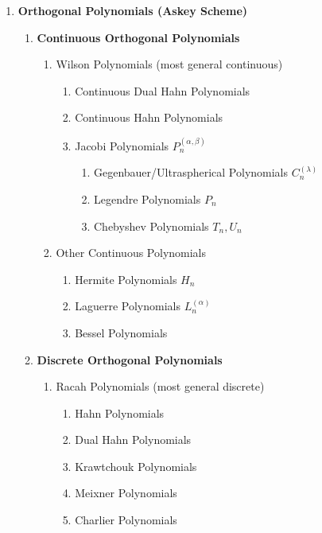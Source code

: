 \begin{enumerate}[label=\textbf{\arabic*.}]
	\item \textbf{Orthogonal Polynomials (Askey Scheme)}
	\begin{enumerate}[label=\textbf{\alph*)}]
		\item \textbf{Continuous Orthogonal Polynomials}
		\begin{enumerate}[label=\textbf{\roman*)}]
			\item Wilson Polynomials (most general continuous)
			\begin{enumerate}[label=\textbf{\arabic*)}]
				\item Continuous Dual Hahn Polynomials
				\item Continuous Hahn Polynomials
				\item Jacobi Polynomials $P_n^{(\alpha,\beta)}$
				\begin{enumerate}[label=\textbf{\Alph*)}]
					\item Gegenbauer/Ultraspherical Polynomials $C_n^{(\lambda)}$
					\item Legendre Polynomials $P_n$
					\item Chebyshev Polynomials $T_n, U_n$
				\end{enumerate}
			\end{enumerate}
			\item Other Continuous Polynomials
			\begin{enumerate}[label=\textbf{\arabic*)}]
				\item Hermite Polynomials $H_n$
				\item Laguerre Polynomials $L_n^{(\alpha)}$
				\item Bessel Polynomials
			\end{enumerate}
		\end{enumerate}
		
		\item \textbf{Discrete Orthogonal Polynomials}
		\begin{enumerate}[label=\textbf{\roman*)}]
			\item Racah Polynomials (most general discrete)
			\begin{enumerate}[label=\textbf{\arabic*)}]
				\item Hahn Polynomials
				\item Dual Hahn Polynomials
				\item Krawtchouk Polynomials
				\item Meixner Polynomials
				\item Charlier Polynomials
			\end{enumerate}
		\end{enumerate}
		

\end{enumerate}
\end{enumerate}

